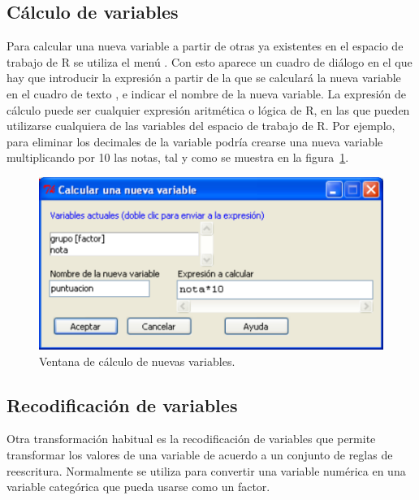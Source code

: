 \subsection{Cálculo de variables}
Para calcular una nueva variable a partir de otras ya existentes en el espacio de trabajo de R se utiliza el menú
.
Con esto aparece un cuadro de diálogo en el que hay que introducir la expresión a partir de la que se calculará la nueva
variable en el cuadro de texto , e indicar el nombre de la nueva variable.
La expresión de cálculo puede ser cualquier expresión aritmética o lógica de R, en las que pueden utilizarse cualquiera
de las variables del espacio de trabajo de R. Por ejemplo, para eliminar los decimales de la variable 
podría crearse una nueva variable  multiplicando por 10 las notas, tal y como se muestra en la
figura~\ref{g:calcular_variable}.

\begin{figure}[htp]
\begin{center}
  \includegraphics[scale=0.6]{introduccion_r/img/calcular}
  \caption{Ventana de cálculo de nuevas variables.}
  \label{g:calcular_variable}
\end{center}
\end{figure}


\subsection{Recodificación de variables}
Otra transformación habitual es la recodificación de variables que permite transformar los valores de una variable de
acuerdo a un conjunto de reglas de reescritura. Normalmente se utiliza para convertir una variable numérica en una
variable categórica que pueda usarse como un factor. 

